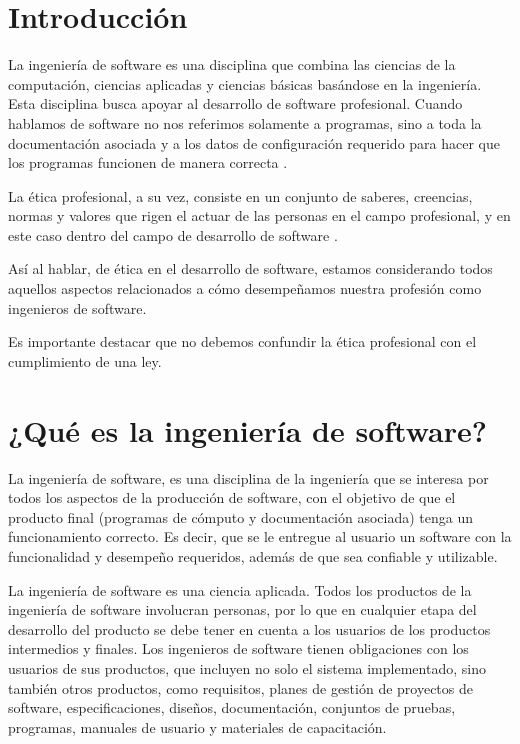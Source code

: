 \documentclass[twoside]{article}
\begin{document}
\begin{multicols}{2} %

\section{Introducción}

La ingeniería de software es una disciplina que combina las ciencias de la
computación, ciencias aplicadas y ciencias básicas basándose en la ingeniería.
Esta disciplina busca apoyar al desarrollo de software profesional. Cuando
hablamos de software no nos referimos solamente a programas, sino a toda la
documentación  asociada y a los datos de configuración requerido para hacer que
los programas funcionen de manera correcta \cite{sommerville2005ingenieria}.

La ética profesional, a su vez, consiste en un conjunto de saberes, creencias,
normas y valores que rigen el actuar de las personas en el campo profesional, y
en este caso dentro del campo de desarrollo de software
\cite{yuren2013etica}.

Así al hablar, de ética en el desarrollo de software, estamos considerando todos
aquellos aspectos relacionados a cómo desempeñamos nuestra profesión como
ingenieros de software.

Es importante destacar que no debemos confundir la ética profesional con el
cumplimiento de una ley.

\section{¿Qué es la ingeniería de software?}

La ingeniería de software, es una disciplina de la ingeniería que se interesa
por todos los aspectos de la producción de software, con el objetivo de que el
producto final (programas de cómputo y documentación asociada) tenga un
funcionamiento correcto. Es decir, que se le entregue al usuario un software con
la funcionalidad y desempeño requeridos, además de que sea confiable y
utilizable.

La ingeniería de software es una ciencia aplicada. Todos los productos de la
ingeniería de software involucran personas, por lo que en cualquier etapa del
desarrollo del producto se debe tener en cuenta a los usuarios de los productos
intermedios y finales. Los ingenieros de software tienen obligaciones con los
usuarios de sus productos, que incluyen no solo el sistema implementado, sino
también otros productos, como requisitos, planes de gestión de proyectos de
software, especificaciones, diseños, documentación, conjuntos de pruebas,
programas, manuales de usuario y materiales de capacitación.


\end{multicols}
\end{document}
